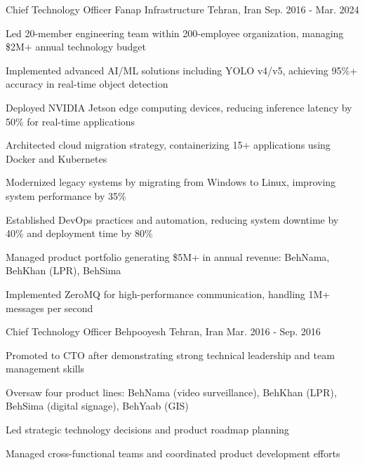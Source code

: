 \begin{cventries}
  \cventry
    {Chief Technology Officer} %
    {Fanap Infrastructure} %
    {Tehran, Iran} %
    {Sep. 2016 - Mar. 2024} %
    {
      \begin{cvitems} %
        \item {Led 20-member engineering team within 200-employee organization, managing \$2M+ annual technology budget}
        \item {Implemented advanced AI/ML solutions including YOLO v4/v5, achieving 95\%+ accuracy in real-time object detection}
        \item {Deployed NVIDIA Jetson edge computing devices, reducing inference latency by 50\% for real-time applications}
        \item {Architected cloud migration strategy, containerizing 15+ applications using Docker and Kubernetes}
        \item {Modernized legacy systems by migrating from Windows to Linux, improving system performance by 35\%}
        \item {Established DevOps practices and automation, reducing system downtime by 40\% and deployment time by 80\%}
        \item {Managed product portfolio generating \$5M+ in annual revenue: BehNama, BehKhan (LPR), BehSima}
        \item {Implemented ZeroMQ for high-performance communication, handling 1M+ messages per second}
      \end{cvitems}
    }

  \cventry
    {Chief Technology Officer} %
    {Behpooyesh} %
    {Tehran, Iran} %
    {Mar. 2016 - Sep. 2016} %
    {
      \begin{cvitems} %
        \item {Promoted to CTO after demonstrating strong technical leadership and team management skills}
        \item {Oversaw four product lines: BehNama (video surveillance), BehKhan (LPR), BehSima (digital signage), BehYaab (GIS)}
        \item {Led strategic technology decisions and product roadmap planning}
        \item {Managed cross-functional teams and coordinated product development efforts}
      \end{cvitems}
    }


\end{cventries}
